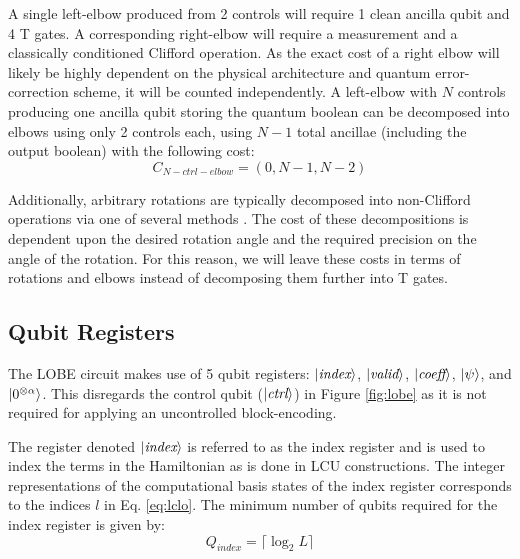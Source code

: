 A single left-elbow produced from 2 controls will require 1 clean ancilla qubit and 4 T gates. 
A corresponding right-elbow will require a measurement and a classically conditioned Clifford operation.
As the exact cost of a right elbow will likely be highly dependent on the physical architecture and quantum error-correction scheme, it will be counted independently.
A left-elbow with $N$ controls producing one ancilla qubit storing the quantum boolean can be decomposed into elbows using only 2 controls each, using $N-1$ total ancillae (including the output boolean) with the following cost:
\begin{equation}
    \label{eq:N-ctrl-elbow}
    C_{N-ctrl-elbow} = (0, N-1, N-2)
\end{equation}

Additionally, arbitrary rotations are typically decomposed into non-Clifford operations via one of several methods \cite{}.  
The cost of these decompositions is dependent upon the desired rotation angle and the required precision on the angle of the rotation.
For this reason, we will leave these costs in terms of rotations and elbows instead of decomposing them further into T gates.

\subsection{Qubit Registers}
\label{subsec:registers}

The LOBE circuit makes use of 5 qubit registers: $\ket{\textit{index}}$, $\ket{\textit{valid}}$, $\ket{\textit{coeff}}$, $\ket{\psi}$, and $\ket{0^{\otimes \alpha}}$.
This disregards the control qubit ($\ket{\textit{ctrl}}$) in Figure \ref{fig:lobe} as it is not required for applying an uncontrolled block-encoding.

The register denoted $\ket{\textit{index}}$ is referred to as the index register and is used to index the terms in the Hamiltonian as is done in LCU constructions. 
The integer representations of the computational basis states of the index register corresponds to the indices $l$ in Eq. \ref{eq:lclo}. 
The minimum number of qubits required for the index register is given by:
\begin{equation}
    Q_{\textit{index}} = \lceil \log_2{L} \rceil
\end{equation}

